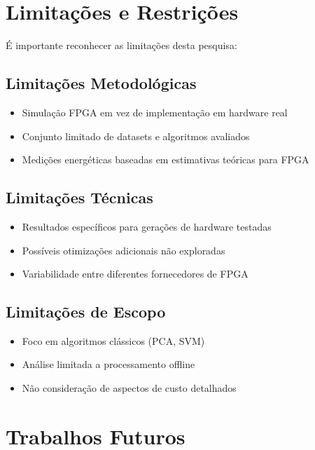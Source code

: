 \section{Limitações e Restrições}\label{sec:limitacoes_finais}

É importante reconhecer as limitações desta pesquisa:

\subsection{Limitações Metodológicas}
\begin{itemize}
    \item Simulação FPGA em vez de implementação em hardware real
    \item Conjunto limitado de datasets e algoritmos avaliados
    \item Medições energéticas baseadas em estimativas teóricas para FPGA
\end{itemize}

\subsection{Limitações Técnicas}
\begin{itemize}
    \item Resultados específicos para gerações de hardware testadas
    \item Possíveis otimizações adicionais não exploradas
    \item Variabilidade entre diferentes fornecedores de FPGA
\end{itemize}

\subsection{Limitações de Escopo}
\begin{itemize}
    \item Foco em algoritmos clássicos (PCA, SVM)
    \item Análise limitada a processamento offline
    \item Não consideração de aspectos de custo detalhados
\end{itemize}

\section{Trabalhos Futuros}\label{sec:trabalhos_futuros_conclusao}

